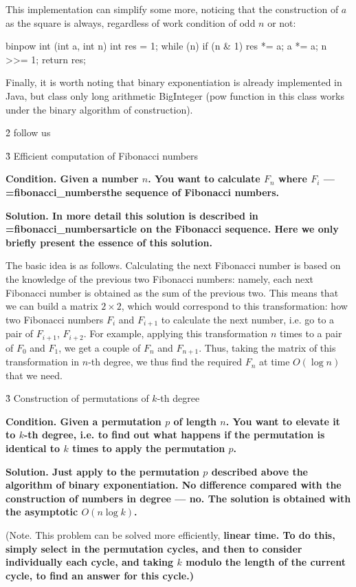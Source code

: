 This implementation can simplify some more, noticing that the construction of $a$ as the square is always, regardless of work condition of odd $n$ or not:

\code
binpow int (int a, int n) {
int res = 1;
while (n) {
if (n & 1)
res *= a;
a *= a;
n >>= 1;
}
return res;
}
\endcode

Finally, it is worth noting that binary exponentiation is already implemented in Java, but class only long arithmetic BigInteger (pow function in this class works under the binary algorithm of construction).



\h2{ follow us }


\h3{ Efficient computation of Fibonacci numbers }

\bf{Condition}. Given a number $n$. You want to calculate $F_n$ where $F_i$ --- \algohref=fibonacci_numbers{the sequence of Fibonacci numbers}.

\bf{Solution}. In more detail this solution is described in \algohref=fibonacci_numbers{article on the Fibonacci sequence}. Here we only briefly present the essence of this solution.

The basic idea is as follows. Calculating the next Fibonacci number is based on the knowledge of the previous two Fibonacci numbers: namely, each next Fibonacci number is obtained as the sum of the previous two. This means that we can build a matrix $2 \times 2$, which would correspond to this transformation: how two Fibonacci numbers $F_i$ and $F_{i+1}$ to calculate the next number, i.e. go to a pair of $F_{i+1}$, $F_{i+2}$. For example, applying this transformation $n$ times to a pair of $F_0$ and $F_1$, we get a couple of $F_n$ and $F_{n+1}$. Thus, taking the matrix of this transformation in $n$-th degree, we thus find the required $F_n$ at time $O (\log n)$ that we need.


\h3{ Construction of permutations of $k$-th degree }

\bf{Condition}. Given a permutation $p$ of length $n$. You want to elevate it to $k$-th degree, i.e. to find out what happens if the permutation is identical to $k$ times to apply the permutation $p$.

\bf{Solution}. Just apply to the permutation $p$ described above the algorithm of binary exponentiation. No difference compared with the construction of numbers in degree --- no. The solution is obtained with the asymptotic $O (n \log k)$.

(Note. This problem can be solved more efficiently, \bf{linear time}. To do this, simply select in the permutation cycles, and then to consider individually each cycle, and taking $k$ modulo the length of the current cycle, to find an answer for this cycle.)


